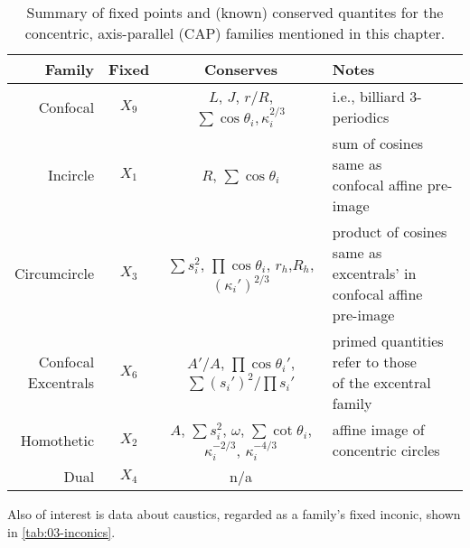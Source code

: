 \begin{table}
\centering
\begin{tabular}{|r|c|c|l|}
\hline
Family & Fixed & Conserves & Notes \\
\hline
Confocal & $X_9$ & \makecell[cc]{$L$, $J$, $r/R$,\\$\sum\cos\theta_i,\kappa_i^{2/3}$} & i.e., billiard 3-periodics \\
\hline
Incircle & $X_1$ & $R$, $\sum\cos\theta_i$ & \makecell[lc]{sum of cosines same as\\confocal affine pre-image} \\
\hline
Circumcircle & $X_3$ & \makecell[cc]{$\sum{s_i^2}$, $\prod\cos\theta_i$,\\$r_h$,$R_h$,$(\kappa_i')^{2/3}$} & \makecell[lc]{product of cosines same as\\excentrals' in confocal affine\\pre-image} \\
\hline
\makecell[rc]{Confocal\\Excentrals} & $X_6$ & \makecell[cc]{$A'/A$, $\prod\cos\theta_i'$,\\$\sum{(s_i')^2}/\prod{s_i'}$} & \makecell[lc]{primed quantities refer to those\\of the excentral family}  \\
\hline
Homothetic & $X_2$ & \makecell[cc]{$A$, $\sum{s_i^2}$, $\omega$,\\$\sum\cot\theta_i$, $\kappa_i^{-2/3}$, $\kappa_i^{-4/3}$} & affine image of concentric circles  \\
\hline
Dual & $X_4$ & n/a &  \\
\hline
\end{tabular}
\caption{Summary of fixed points and (known) conserved quantites for the concentric, axis-parallel (CAP) families mentioned in this chapter.}
\label{tab:n3-conc-families}
\end{table}

Also of interest is data about caustics, regarded as a family's fixed inconic, shown in \cref{tab:03-inconics}.

